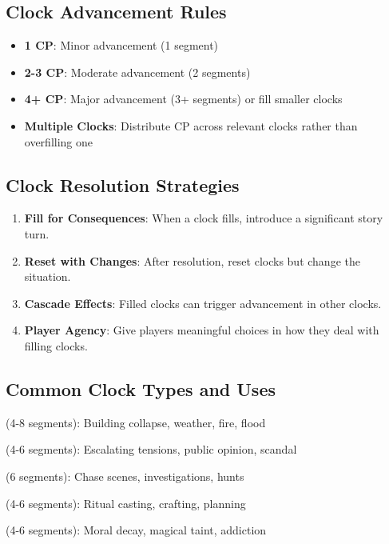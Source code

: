 \subsection*{Clock Advancement Rules}

\begin{itemize}[leftmargin=*]
\item \textbf{1 CP}: Minor advancement (1 segment)
\item \textbf{2-3 CP}: Moderate advancement (2 segments)  
\item \textbf{4+ CP}: Major advancement (3+ segments) or fill smaller clocks
\item \textbf{Multiple Clocks}: Distribute CP across relevant clocks rather than overfilling one
\end{itemize}

\subsection*{Clock Resolution Strategies}

\begin{enumerate}[leftmargin=*]
\item \textbf{Fill for Consequences}: When a clock fills, introduce a significant story turn.
\item \textbf{Reset with Changes}: After resolution, reset clocks but change the situation.
\item \textbf{Cascade Effects}: Filled clocks can trigger advancement in other clocks.
\item \textbf{Player Agency}: Give players meaningful choices in how they deal with filling clocks.
\end{enumerate}

\subsection*{Common Clock Types and Uses}

\begin{description}[leftmargin=*]
\item[Environmental Clocks] (4-8 segments): Building collapse, weather, fire, flood
\item[Social Clocks] (4-6 segments): Escalating tensions, public opinion, scandal  
\item[Pursuit Clocks] (6 segments): Chase scenes, investigations, hunts
\item[Preparation Clocks] (4-6 segments): Ritual casting, crafting, planning
\item[Corruption Clocks] (4-6 segments): Moral decay, magical taint, addiction
\end{description}

